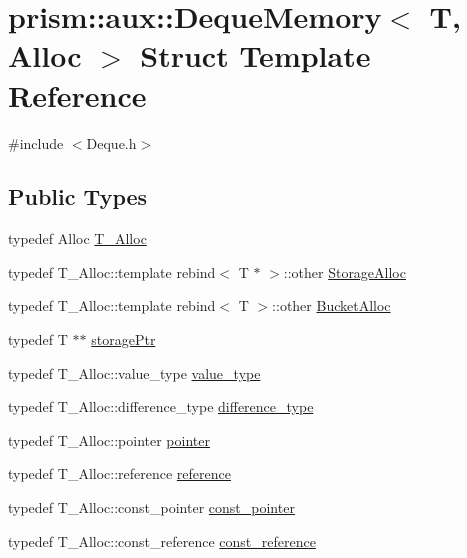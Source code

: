 \hypertarget{structprism_1_1aux_1_1_deque_memory}{}\section{prism\+:\+:aux\+:\+:Deque\+Memory$<$ T, Alloc $>$ Struct Template Reference}
\label{structprism_1_1aux_1_1_deque_memory}


{\ttfamily \#include $<$Deque.\+h$>$}

\subsection*{Public Types}
\begin{DoxyCompactItemize}
\item 
typedef Alloc \hyperlink{structprism_1_1aux_1_1_deque_memory_ae51ea3bab8a3bb39d82eb9032396b980}{T\+\_\+\+Alloc}
\item 
typedef T\+\_\+\+Alloc\+::template rebind$<$ T $\ast$ $>$\+::other \hyperlink{structprism_1_1aux_1_1_deque_memory_ac314b95624792862b1c97ea15e5bffd5}{Storage\+Alloc}
\item 
typedef T\+\_\+\+Alloc\+::template rebind$<$ T $>$\+::other \hyperlink{structprism_1_1aux_1_1_deque_memory_a06ddbfbcfbfb11f94d53cd8cc9942044}{Bucket\+Alloc}
\item 
typedef T $\ast$$\ast$ \hyperlink{structprism_1_1aux_1_1_deque_memory_a94284c2277f5fbe4b5d0725467d5a6d3}{storage\+Ptr}
\item 
typedef T\+\_\+\+Alloc\+::value\+\_\+type \hyperlink{structprism_1_1aux_1_1_deque_memory_a31e50c9510a485f6ca2bd0be12b9fac6}{value\+\_\+type}
\item 
typedef T\+\_\+\+Alloc\+::difference\+\_\+type \hyperlink{structprism_1_1aux_1_1_deque_memory_a9f6b9845bb59ab3edcbb3f846156307e}{difference\+\_\+type}
\item 
typedef T\+\_\+\+Alloc\+::pointer \hyperlink{structprism_1_1aux_1_1_deque_memory_a049807cdb47e3a25795342851d9c77aa}{pointer}
\item 
typedef T\+\_\+\+Alloc\+::reference \hyperlink{structprism_1_1aux_1_1_deque_memory_a735c5ea8341a854c7b0a9927c1296985}{reference}
\item 
typedef T\+\_\+\+Alloc\+::const\+\_\+pointer \hyperlink{structprism_1_1aux_1_1_deque_memory_aad3d6caf7c7594161f7ae44034427f0f}{const\+\_\+pointer}
\item 
typedef T\+\_\+\+Alloc\+::const\+\_\+reference \hyperlink{structprism_1_1aux_1_1_deque_memory_aea80995c139d8feb404c03404667d122}{const\+\_\+reference}
\end{DoxyCompactItemize}
